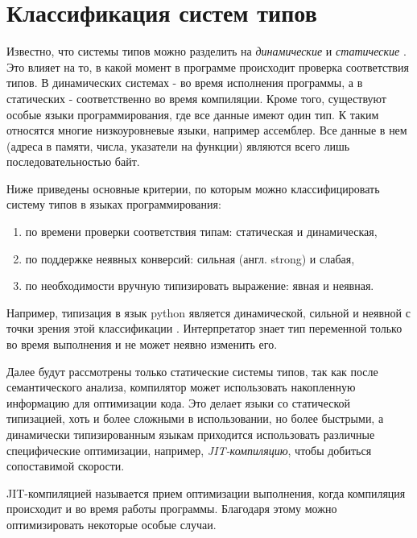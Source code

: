\chapter{Классификация систем типов}
\label{ch:classification}

Известно, что системы типов можно разделить на \textit{динамические} и \textit{статические} \cite{Typing}.
Это влияет на то, в какой момент в программе происходит проверка соответствия типов.
В динамических системах - во время исполнения программы, а в статических - соответственно во время компиляции.
Кроме того, существуют особые языки программирования, где все данные имеют один тип.
К таким относятся многие низкоуровневые языки, например ассемблер.
Все данные в нем (адреса в памяти, числа, указатели на функции) являются всего лишь последовательностью байт.

Ниже приведены основные критерии, по которым можно классифицировать систему типов в языках программирования:

\begin{enumerate}[1)]
    \item по времени проверки соответствия типам: статическая и динамическая,
    \item по поддержке неявных конверсий: сильная (англ. strong) и слабая,
    \item по необходимости вручную типизировать выражение: явная и неявная.
\end{enumerate}

Например, типизация в язык python является динамической, сильной и неявной с точки зрения этой классификации \cite{PythonWiki}.
Интерпретатор знает тип переменной только во время выполнения и не может неявно изменить его.

Далее будут рассмотрены только статические системы типов, так как после семантического анализа, компилятор может использовать накопленную информацию для оптимизации кода.
Это делает языки со статической типизацией, хоть и более сложными в использовании, но более быстрыми, а динамически типизированным языкам приходится использовать различные специфические оптимизации, например, \textit{JIT-компиляцию}, чтобы добиться сопоставимой скорости.

JIT-компиляцией называется прием оптимизации выполнения, когда компиляция происходит и во время работы программы.
Благодаря этому можно оптимизировать некоторые особые случаи.

